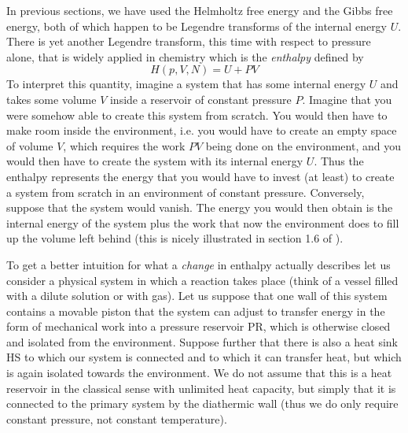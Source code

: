 \documentclass[a4paper, draft]{report}
\numberwithin{section}{chapter}
\numberwithin{equation}{chapter}
\theoremstyle{own}
\theoremstyle{remark}
\begin{document}
In previous sections, we have used the Helmholtz free energy and the Gibbs free energy, both of which happen to be Legendre transforms of the internal energy $U$. There is yet another Legendre transform, this time with respect to pressure alone, that is widely applied in chemistry which is the {\em enthalpy} defined by
$$
H(p, V, N) = U + PV
$$
To interpret this quantity, imagine a system that has some internal energy $U$ and takes some volume $V$ inside a reservoir of constant pressure $P$. Imagine that you were somehow able to create this system from scratch. You would then have to make room inside the environment, i.e. you would have to create an empty space of volume $V$, which requires the work $PV$ being done on the environment, and you would then have to create the system with its internal energy $U$. Thus the enthalpy represents the energy that you would have to invest (at least) to create a system from scratch in an environment of constant pressure. Conversely, suppose that the system would vanish. The energy you would then obtain is the internal energy of the system plus the work that now the environment does to fill up the volume left behind (this is nicely illustrated in section 1.6 of \cite{Schroeder}).

To get a better intuition for what a {\em change} in enthalpy actually describes let us consider a physical system in which a reaction takes place (think of a vessel filled with a dilute solution or with gas). Let us suppose that one wall of this system contains a movable piston that the system can adjust to transfer energy in the form of mechanical work into a pressure reservoir PR, which is otherwise closed and isolated from the environment. Suppose further that there is also a heat sink HS to which our system is connected and to which it can transfer heat, but which is again isolated towards the environment. We do not assume that this is a heat reservoir in the classical sense with unlimited heat capacity, but simply that it is connected to the primary system by the diathermic wall (thus we do only require constant pressure, not constant temperature).
\end{document}

